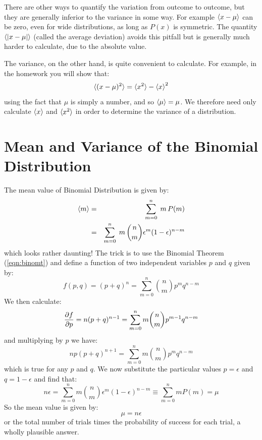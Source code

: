\documentclass[12pt,oneside]{book}
\begin{document}
There are other ways to quantify the variation from outcome to
outcome, but they are generally inferior to the variance in some way.
For example $\braket{x-\mu}$ can be zero, even for wide distributions,
as long as $P(x)$ is symmetric.  The quantity $\braket{|x-\mu|}$
(called the average deviation) avoids this pitfall but is generally
much harder to calculate, due to the absolute value.

The variance, on the other hand, is quite convenient to calculate.
For example, in the homework you will show that:
\begin{equation}
\label{eqn:varhw}
\braket{(x-\mu)^2} = \braket{x^2} -\braket{x}^2
\end{equation}
using the fact that $\mu$ is simply a number, and so $\braket{\mu} =
\mu$.  We therefore need only calculate $\braket{x}$ and $\braket{x^2}$ in order
to determine the variance of a distribution.

\section{Mean and Variance of the Binomial Distribution}

The mean value of Binomial Distribution is given by:
\begin{eqnarray*}
\braket{m} &=& \sum_{m=0}^n \; m \, P(m) \\
&=& \sum_{m=0}^n \; m \, \binom{n}{m} \epsilon^m (1-\epsilon)^{n-m} \\
\end{eqnarray*}
which looks rather daunting!  The trick is to use the Binomial Theorem (\ref{eqn:binomt}) and define a function of two independent variables $p$ and $q$ given by:
\begin{displaymath}
f(p,q) = (p+q)^n = \sum_{m=0}^n \binom{n}{m} p^m q^{n-m}
\end{displaymath}
We then calculate:
\begin{displaymath}
\frac{\partial f}{\partial p} = n(p+q)^{n-1} = \sum_{m=0}^n m \binom{n}{m} p^{m-1} q^{n-m} \\
\end{displaymath}
and multiplying by $p$ we have:
\begin{displaymath}
np(p+q)^{n+1} = \sum_{m=0}^n m \binom{n}{m} p^m q^{n-m}
\end{displaymath}
which is true for any $p$ and $q$.  We now substitute the particular values $p=\epsilon$ and $q=1-\epsilon$ and find that:
\begin{displaymath}
n \epsilon = \sum_{m=0}^n m \binom{n}{m} \epsilon^m (1-\epsilon)^{n-m} \equiv \sum_{m=0}^n m P(m) = \mu
\end{displaymath}
So the mean value is given by:
\begin{equation}
\mu = n \epsilon
\end{equation}
or the total number of trials times the probability of success for each trial, a wholly plausible answer.
\end{document}
